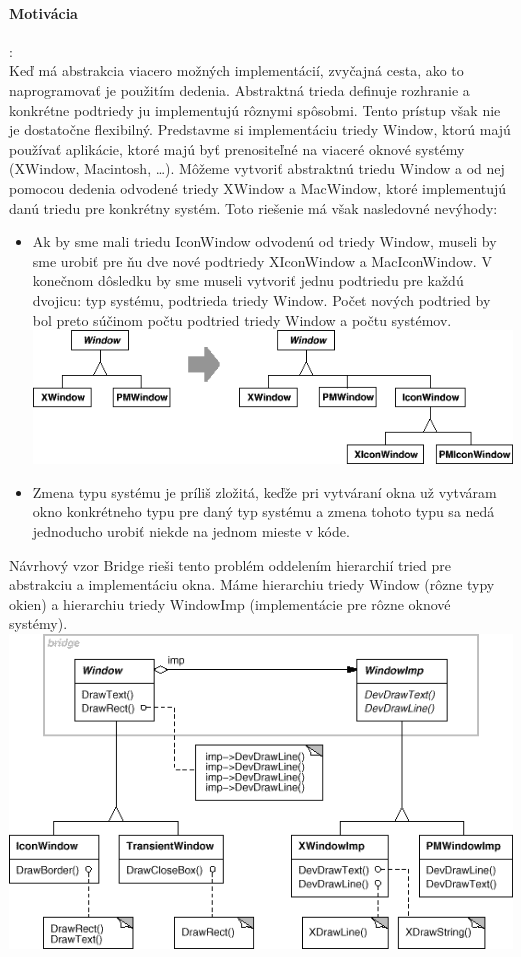 	\paragraph{Motivácia}:\\
		Keď má abstrakcia viacero možných implementácií, zvyčajná cesta, ako to naprogramovať je použitím dedenia. Abstraktná trieda definuje rozhranie a konkrétne podtriedy ju implementujú rôznymi spôsobmi. Tento prístup však nie je dostatočne flexibilný. Predstavme si implementáciu triedy Window, ktorú majú používať aplikácie, ktoré majú byť prenositeľné na viaceré oknové systémy (XWindow, Macintosh, …). Môžeme vytvoriť abstraktnú triedu Window a od nej pomocou dedenia odvodené triedy XWindow a MacWindow, ktoré implementujú danú triedu pre konkrétny systém. Toto riešenie má však nasledovné nevýhody:
		\begin{itemize}
			\item Ak by sme mali triedu IconWindow odvodenú od triedy Window, museli by sme urobiť pre ňu dve nové podtriedy XIconWindow a MacIconWindow. V konečnom dôsledku by sme museli vytvoriť jednu podtriedu pre každú dvojicu: typ systému, podtrieda triedy Window. Počet nových podtried by bol preto súčinom počtu podtried triedy Window a počtu systémov.\\

			\includegraphics[width=.9\textwidth]{images/bridge1}


			\item Zmena typu systému je príliš zložitá, keďže pri vytváraní okna už vytváram okno konkrétneho typu pre daný typ systému a zmena tohoto typu sa nedá jednoducho urobiť niekde na jednom mieste v kóde.
		\end{itemize}
		Návrhový vzor Bridge rieši tento problém oddelením hierarchií tried pre abstrakciu a implementáciu okna. Máme hierarchiu triedy Window (rôzne typy okien) a hierarchiu triedy WindowImp (implementácie pre rôzne oknové systémy).\\

	\includegraphics[width=.9\textwidth]{images/bridge2}



